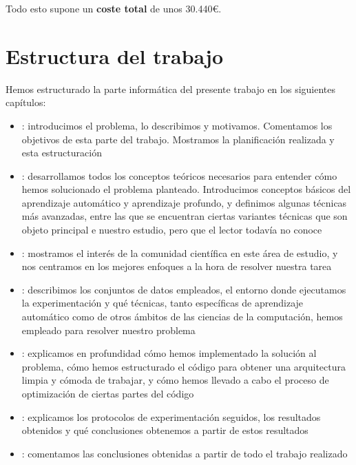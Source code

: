 Todo esto supone un \textbf{coste total} de unos 30.440€.

\section{Estructura del trabajo}

Hemos estructurado la parte informática del presente trabajo en los siguientes capítulos:

\begin{itemize}
	\item {}: introducimos el problema, lo describimos y motivamos. Comentamos los objetivos de esta parte del trabajo. Mostramos la planificación realizada y esta estructuración
	\item {}: desarrollamos todos los conceptos teóricos necesarios para entender cómo hemos solucionado el problema planteado. Introducimos conceptos básicos del aprendizaje automático y aprendizaje profundo, y definimos algunas técnicas más avanzadas, entre las que se encuentran ciertas variantes técnicas que son objeto principal e nuestro estudio, pero que el lector todavía no conoce
	\item {}: mostramos el interés de la comunidad científica en este área de estudio, y nos centramos en los mejores enfoques a la hora de resolver nuestra tarea
	\item {}: describimos los conjuntos de datos empleados, el entorno donde ejecutamos la experimentación y qué técnicas, tanto específicas de aprendizaje automático como de otros ámbitos de las ciencias de la computación, hemos empleado para resolver nuestro problema
	\item {}: explicamos en profundidad cómo hemos implementado la solución al problema, cómo hemos estructurado el código para obtener una arquitectura limpia y cómoda de trabajar, y cómo hemos llevado a cabo el proceso de optimización de ciertas partes del código
	\item {}: explicamos los protocolos de experimentación seguidos, los resultados obtenidos y qué conclusiones obtenemos a partir de estos resultados
	\item {}: comentamos las conclusiones obtenidas a partir de todo el trabajo realizado
\end{itemize}
